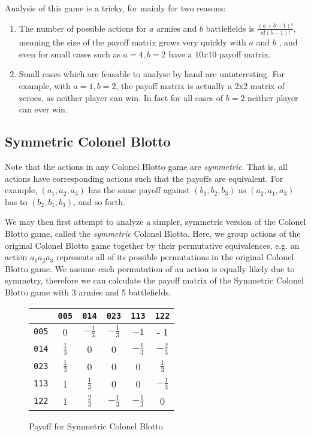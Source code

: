 \documentclass [11pt]{article}
\begin{document}
Analysis of this game is a tricky, for mainly for two reasons:

\begin{enumerate}
  \item The number of possible actions for $a$ armies and $b$ battlefields is $\frac{(a + b - 1)!}{a! (b -1)!}$, meaning the size of the payoff matrix grows very quickly with $a$ and $b$ , and even for small cases such as $a=4, b=2$  have a $10x10$ payoff matrix.
  \item Small cases which are feasable to analyse by hand are uninteresting. For example, with $a = 1, b = 2$, the payoff matrix is actually a 2x2 matrix of zeroes, as neither player can win. In fact for all cases of $b=2$ neither player can ever win.
\end{enumerate}

\subsection{Symmetric Colonel Blotto}

Note that the actions in any Colonel Blotto game are \textit{symmetric}. That is, all actions have corresponding actions such that the payoffs are equivalent. For example, $(a_1, a_2, a_3)$ has the same payoff against $(b_1, b_2, b_3)$ as $(a_2, a_1, a_3)$ has to $(b_2, b_1, b_3)$, and so forth.

We may then first attempt to analyze a simpler, symmetric version of the Colonel Blotto game, called the \textit{symmetric} Colonel Blotto. Here, we group actions of the original Colonel Blotto game together by their permutative equivalences, e.g. an action $a_1 a_2 a_3 $ represents all of its possible permutations in the original Colonel Blotto game. We assume each permutation of an action is equally likely due to symmetry, therefore we can calculate the payoff matrix of the Symmetric Colonel Blotto game with 3 armies and 5 battlefields.

\begin{figure}[H]
  \renewcommand{\arraystretch}{1.75}
  \centering
  \begin{tabular}{|c|c|c|c|c|c|}
  \hline
  & \texttt{005} & \texttt{014} & \texttt{023} & \texttt{113} & \texttt{122} \\[2ex]
  \hline
    \texttt{005} & 0 & $- \frac{1}{3}$ & $- \frac{1}{3}$ & $-1$ & - 1 \\
    \hline
    \texttt{014} & $\frac{1}{3}$ & 0 & 0 & $-\frac{1}{3}$ & $- \frac{2}{3}$ \\
    \hline
    \texttt{023} & $\frac{1}{3}$ & 0 & 0 & 0 & $ \frac{1}{3}$ \\
    \hline
    \texttt{113} & 1 & $\frac{1}{3}$ & 0 & 0 & $ -\frac{1}{3}$ \\
    \hline
    \texttt{122} & 1 & $\frac{2}{3}$ & $-\frac{1}{3}$ & $-\frac{1}{3}$ & 0 \\
    \hline
  \end{tabular}
  \caption{Payoff for Symmetric Colonel Blotto}%
  \label{sym-blotto-full}
\end{figure}
\end{document}
